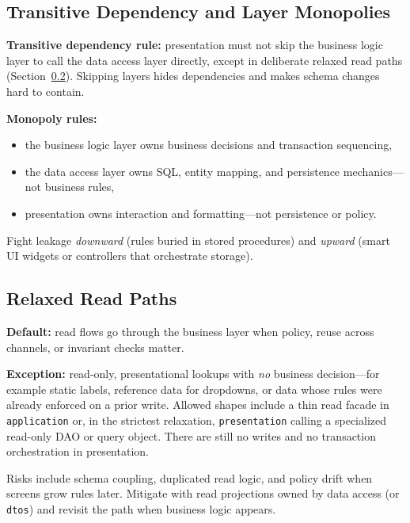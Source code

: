 \subsection{Transitive Dependency and Layer Monopolies}
\label{sec:three_layered_guardrails}

\textbf{Transitive dependency rule:} presentation must not skip the business logic layer to call the data access layer directly, except in deliberate relaxed read paths (Section~\ref{sec:three_layered_relaxed_reads}). Skipping layers hides dependencies and makes schema changes hard to contain.\autocite{microsoft2003layered}

\textbf{Monopoly rules:}
\begin{itemize}
    \item the business logic layer owns business decisions and transaction sequencing,
    \item the data access layer owns SQL, entity mapping, and persistence mechanics---not business rules,
    \item presentation owns interaction and formatting---not persistence or policy.
\end{itemize}

Fight leakage \textit{downward} (rules buried in stored procedures) and \textit{upward} (smart UI widgets or controllers that orchestrate storage).

\subsection{Relaxed Read Paths}
\label{sec:three_layered_relaxed_reads}

\textbf{Default:} read flows go through the business layer when policy, reuse across channels, or invariant checks matter.

\textbf{Exception:} read-only, presentational lookups with \textit{no} business decision---for example static labels, reference data for dropdowns, or data whose rules were already enforced on a prior write. Allowed shapes include a thin read facade in \texttt{application} or, in the strictest relaxation, \texttt{presentation} calling a specialized read-only DAO or query object. There are still no writes and no transaction orchestration in presentation.

Risks include schema coupling, duplicated read logic, and policy drift when screens grow rules later. Mitigate with read projections owned by data access (or \texttt{dtos}) and revisit the path when business logic appears.

